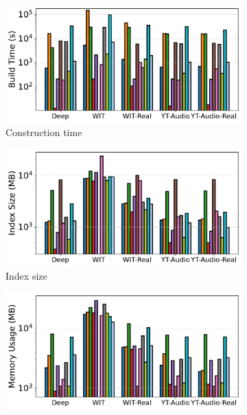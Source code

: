 \documentclass[sigconf, nonacm]{acmart}
\begin{document}
\begin{figure}[t]
		\begin{subfigure}[t]{0.49\columnwidth}
			\centering
			\captionsetup{font=small}
			\includegraphics[width=\linewidth]{figures/indexData/rangeFilter_build_time_comparison_query.pdf}
			\caption{\footnotesize Construction time}
			\label{fig:rangeFilter_build_time}
		\end{subfigure}
		\hfill
		\begin{subfigure}[t]{0.49\columnwidth}
			\centering
			\includegraphics[width=\linewidth]{figures/indexData/rangeFilter_index_size_mb_comparison_query.pdf}
			\caption{\footnotesize Index size}
			\label{fig:rangeFilter_index_size_mb}
		\end{subfigure}
		\hfill
		\begin{subfigure}[t]{0.49\columnwidth}
			\centering
			\includegraphics[width=\linewidth]{figures/indexData/rangeFilter_memory_mb_comparison_query.pdf}

\end{subfigure}
\end{figure}
\end{document}
